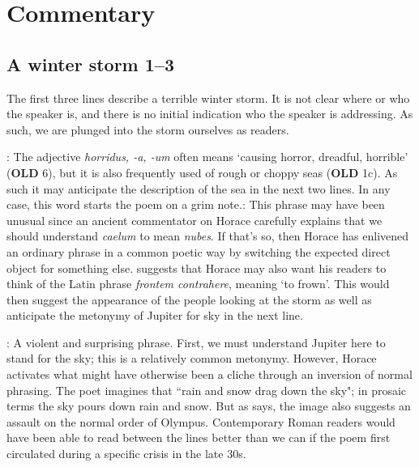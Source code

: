 \chapter*{Commentary}

\section*{A winter storm 1--3}

The first three lines describe a terrible winter storm.  It is not clear where
or who the speaker is, and there is no initial indication who the speaker is
addressing.  As such, we are plunged into the storm ourselves as readers.


: The adjective \textit{horridus, -a, -um} often means `causing
horror, dreadful, horrible' (\textbf{OLD} 6), but it is also frequently used of
rough or choppy seas (\textbf{OLD} 1c).  As such it may anticipate the
description of the sea in the next two lines.  In any case, this word starts
the poem on a grim note.\indent{}: This phrase may have
been unusual since an ancient commentator on Horace carefully explains that we
should understand \textit{caelum} to mean \textit{nubes}.  If that's so, then
Horace has enlivened an ordinary phrase in a common poetic way by switching the
expected direct object for something else.  \citet[215]{mankin1995} suggests
that Horace may also want his readers to think of the Latin phrase
\textit{frontem contrahere}, meaning `to frown'.  This would then suggest the
appearance of the people looking at the storm as well as anticipate the
metonymy of Jupiter for sky in the next line.


: A violent and surprising phrase.
First, we must understand Jupiter here to stand for the sky; this is
a relatively common metonymy.  However, Horace activates what might have
otherwise been a cliche through an inversion of normal phrasing.  The poet
imagines that  ``rain and snow drag down the sky"; in prosaic terms the sky
pours down rain and snow.  But as \citet[215]{mankin1995} says, the image also
suggests an assault on the normal order of Olympus.  Contemporary Roman readers
would have been able to read between the lines better than we can if the poem
first circulated during a specific crisis in the late 30s.

